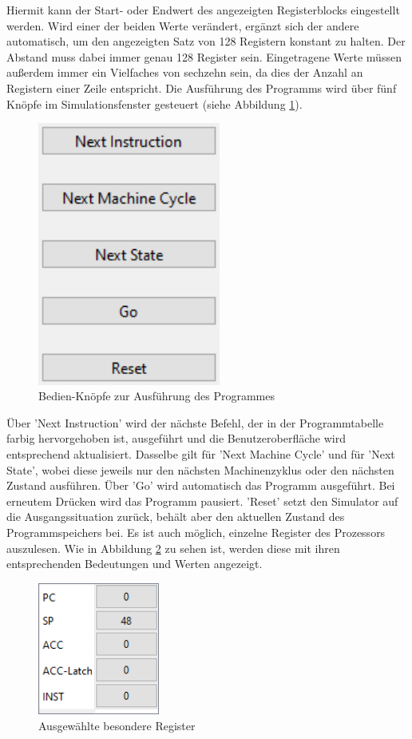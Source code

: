 \documentclass[12pt]{article}
\newcommand{\imgSpaceBefore}{\vspace{10pt}}
\begin{document}
\noindent
Hiermit kann der Start- oder Endwert des angezeigten Registerblocks eingestellt werden. Wird einer der beiden Werte verändert, ergänzt sich der andere automatisch, um den angezeigten Satz von 128 Registern konstant zu halten. Der Abstand muss dabei immer genau 128 Register sein. Eingetragene Werte müssen außerdem immer ein Vielfaches von sechzehn sein, da dies der Anzahl an Registern einer Zeile entspricht. Die Ausführung des Programms wird über fünf Knöpfe im Simulationsfenster gesteuert (siehe Abbildung \ref{fig:Bedienen}).\imgSpaceBefore

\begin{figure}[H]
\centering
\includegraphics[width=6cm]{bilder/Bedienen}
\caption{Bedien-Knöpfe zur Ausführung des Programmes}
\label{fig:Bedienen}
\end{figure}

\noindent
Über 'Next Instruction' wird der nächste Befehl, der in der Programmtabelle farbig hervorgehoben ist, ausgeführt und die Benutzeroberfläche wird entsprechend aktualisiert. Dasselbe gilt für 'Next Machine Cycle' und für 'Next State', wobei diese jeweils nur den nächsten Machinenzyklus oder den nächsten Zustand ausführen. Über 'Go' wird automatisch das Programm ausgeführt. Bei erneutem Drücken wird das Programm pausiert. 'Reset' setzt den Simulator auf die Ausgangssituation zurück, behält aber den aktuellen Zustand des Programmspeichers bei. Es ist auch möglich, einzelne Register des Prozessors auszulesen. Wie in Abbildung \ref{fig:Register} zu sehen ist, werden diese mit ihren entsprechenden Bedeutungen und Werten angezeigt.\imgSpaceBefore

\begin{figure}[h]
\centering
\includegraphics[width=4cm]{bilder/Register}
\caption{Ausgewählte besondere Register}
\label{fig:Register}
\end{figure}
\end{document}
